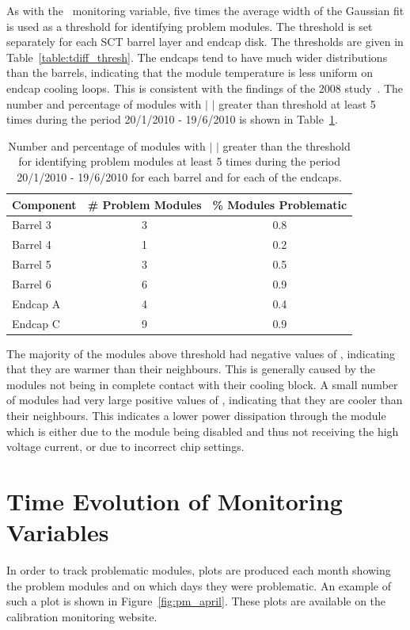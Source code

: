 As with the \deltat\ monitoring variable, five times the average width of the
Gaussian fit is used as a threshold for identifying problem modules. The
threshold is set separately for each SCT barrel layer and endcap disk. The
thresholds are given in Table~\ref{table:tdiff_thresh}. The endcaps tend to have
much wider distributions than the barrels, indicating that the module
temperature is less uniform on endcap cooling loops. This is consistent with the
findings of the 2008 study~\cite{Shaw:1229428}. The number and percentage of modules with $|$
\tdiff$|$ greater than threshold at least 5 times during the period 20/1/2010 -
19/6/2010 is shown in Table~\ref{table:tdiff_num}.

\begin{table}
 \centering
\begin{tabular}{  l  c  c }
\hline\hline
Component & \# Problem Modules & \% Modules Problematic \\
\hline
Barrel 3 & 3 & 0.8 \\
Barrel 4 & 1 & 0.2 \\
Barrel 5 & 3 & 0.5 \\
Barrel 6 & 6 & 0.9 \\
Endcap A & 4 & 0.4 \\
Endcap C & 9 & 0.9 \\
\hline\hline
 \end{tabular}
\caption{Number and percentage of modules with $|$ \tdiff$|$ greater than the
threshold for identifying problem modules at least 5 times during the period
20/1/2010 - 19/6/2010 for each barrel and for each of the endcaps.}
\label{table:tdiff_num}
\end{table}

The majority of the modules above threshold had negative values of \tdiff,
indicating that they are warmer than their neighbours. This is generally caused
by the modules not being in complete contact with their cooling block. A small
number of modules had very large positive values of \tdiff, indicating that they
are cooler than their neighbours. This indicates a lower power dissipation
through the module which is either due to the module being disabled and thus not
receiving the high voltage current, or due to incorrect chip settings.

\section{Time Evolution of Monitoring Variables}

In order to track problematic modules, plots are produced each month showing the
problem modules and on which days they were problematic. An example of such a
plot is shown in Figure~\ref{fig:pm_april}. These plots are available on the
calibration monitoring website.

